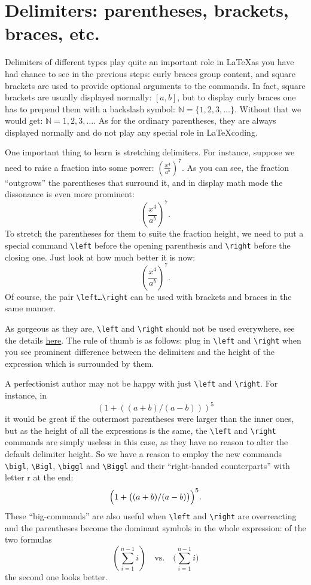 \section{Delimiters: parentheses, brackets, braces, etc.}
\par Delimiters of different types play quite an important role in \LaTeX as you have had chance to see in the previous steps: curly braces group content, and square brackets are used to provide optional arguments to the commands. In fact, square brackets are usually displayed normally: \( [a,b] \), but to display curly braces one has to prepend them with a backslash symbol: \( \mathbb{N} = \{1,2,3,\ldots\} \). Without that we would get: \( \mathbb{N} = {1,2,3,\ldots} \). As for the ordinary parentheses, they are always displayed normally and do not play any special role in \LaTeX coding.
\par One important thing to learn is stretching delimiters. For instance, suppose we need to raise a fraction into some power: \( (\frac{x^4}{a^b})^7 \). As you can see, the fraction ``outgrows'' the parentheses that surround it, and in display math mode the dissonance is even more prominent: \[ (\frac{x^4}{a^b})^7 .\]
To stretch the parentheses for them to suite the fraction height, we need to put a special command \verb"\left" before the opening parenthesis and \verb"\right" before the closing one. Just look at how much better it is now: \[ \left(\frac{x^4}{a^b}\right)^7 .\]
Of course, the pair \verb"\left…\right" can be used with brackets and braces in the same manner.
\par As gorgeous as they are, \verb"\left" and \verb"\right" should not be used everywhere, see the details \href{http://tex.stackexchange.com/a/58641}{here}. The rule of thumb is as follows: plug in \verb"\left" and \verb"\right" when you see prominent difference between the delimiters and the height of the expression which is surrounded by them.
\par A perfectionist author may not be happy with just \verb"\left" and \verb"\right". For instance, in \[\left( 1 + \left( \left( a+b \right)/\left(a-b\right) \right) \right)^5\] it would be great if the outermost parentheses were larger than the inner ones, but as the height of all the expressions is the same, the \verb"\left" and \verb"\right" commands are simply useless in this case, as they have no reason to alter the default delimiter height. So we have a reason to employ the new commands \verb"\bigl", \verb"\Bigl", \verb"\biggl" and \verb"\Biggl"\index{\bigl,\Bigl,\biggl,\Biggl,\bigr,\Bigr,\biggr,\Biggr} and their ``right-handed counterparts'' with letter r at the end: \[\Bigl( 1 + \bigl( (a+b)/(a-b) \bigr) \Bigr)^5.\]
These ``big-commands'' are also useful when \verb"\left" and \verb"\right" are overreacting and the parentheses become the dominant symbols in the whole expression: of the two formulas
\[
\left( \sum_{i=1}^{n-1} i \right)
\quad\text{vs.}\quad
\biggl(\sum_{i=1}^{n-1} i\biggr)
\]
the second one looks better.

